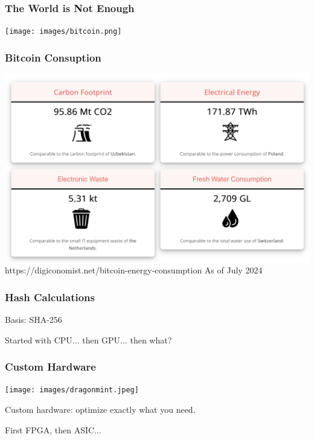 \begin{frame}
\partpage
\end{frame}

\begin{frame}
\frametitle{The World is Not Enough}

\begin{center}
	\texttt{[image: images/bitcoin.png]}
\end{center}


\end{frame}


\begin{frame}
\frametitle{Bitcoin Consuption}

\begin{center}
	\includegraphics[width=\textwidth]{images/Bitcoin-usage.png}\\
	\hfill https://digiconomist.net/bitcoin-energy-consumption As of July 2024
\end{center}


\end{frame}

\begin{frame}
\frametitle{Hash Calculations}

Basis: SHA-256

Started with CPU... then GPU... then what?


\end{frame}

\begin{frame}
\frametitle{Custom Hardware}

\begin{center}
	\texttt{[image: images/dragonmint.jpeg]}
\end{center}

Custom hardware: optimize exactly what you need.

First FPGA, then ASIC...

\end{frame}


